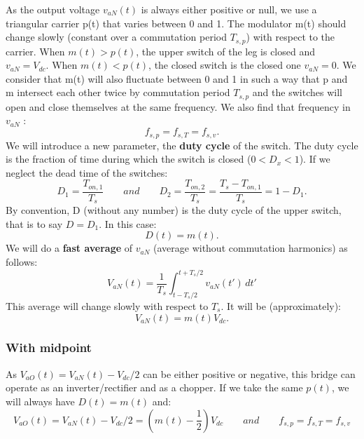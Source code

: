 			As the output voltage $v_{aN}(t)$ is always either positive or null, we use a triangular carrier p(t) that varies between 0 and 1. The modulator m(t) should change slowly (constant over a commutation period $T_{s,p}$) with respect to the carrier. When $m(t) > p(t)$, the upper switch of the leg is closed and $v_{aN} = V_{dc}$. When $m(t) < p(t)$, the closed switch is the closed one $v_{aN} = 0$. We consider that m(t) will also fluctuate between 0 and 1 in such a way that p and m intersect each other twice by commutation period $T_{s,p}$ and the switches will open and close themselves at the same frequency. We also find that frequency in $v_{aN}$ : 
			\begin{equation}
				f_{s,p} = f_{s,T} = f_{s,v}. 
			\end{equation}
			We will introduce a new parameter, the \textbf{duty cycle} of the switch. The duty cycle is the fraction of time during which the switch is closed ($0<D_x<1$). If we neglect the dead time of the switches: 
			\begin{equation}
				D_1 = \frac{T_{on,1}}{T_s} \qquad and \qquad D_2 = \frac{T_{on,2}}{T_s} = \frac{T_s - T_{on,1}}{T_s} = 1 - D_1.
			\end{equation}
			By convention, D (without any number) is the duty cycle of the upper switch, that is to say $D = D_1$. In this case:
			\begin{equation}
				D(t) = m(t). 
			\end{equation}
			We will do a \textbf{fast average} of $v_{aN}$ (average without commutation harmonics) as follows: 
			\begin{equation}
				V_{aN}(t) = \frac{1}{T_s}\int _{t-T_s/2}^{t+T_s/2} v_{aN}(t') \, dt'
			\end{equation}
			This average will change slowly with respect to $T_s$. It will be (approximately): 
			\begin{equation}
				V_{aN}(t) = m(t) V_{dc}. 
			\end{equation}
			
		\subsubsection{With midpoint}
			As $V_{aO}(t) = V_{aN}(t) - V_{dc}/2$ can be either positive or negative, this bridge can operate as an inverter/rectifier and as a chopper. If we take the same $p(t)$, we will always have $D(t) = m(t)$ and:
			\begin{equation}
				V_{aO}(t) = V_{aN}(t) - V_{dc}/2 = (m(t) - \frac{1}{2})V_{dc} \qquad and \qquad f_{s,p} = f_{s,T} =f_{s,v}
			\end{equation}
			
